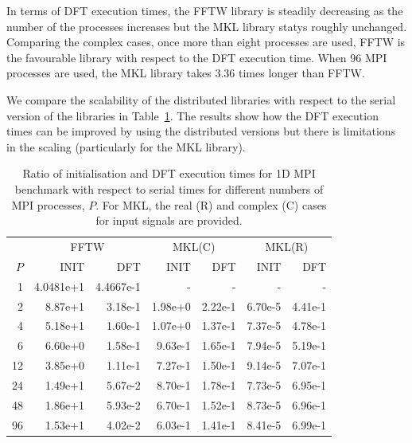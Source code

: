\documentclass[12pt, a4paper]{article} \setlength{\textheight}{24cm}
\begin{document}
In terms of DFT execution times, the FFTW library is steadily
decreasing as the number of the processes increases but the MKL
library statys roughly unchanged. Comparing the complex cases, once
more than eight processes are used, FFTW is the favourable library
with respect to the DFT execution time. When 96 MPI processes are
used, the MKL library takes 3.36 times longer than FFTW.

We compare the scalability of the distributed libraries with respect
to the serial version of the libraries in Table~\ref{Tbl:MPI}. The
results show how the DFT execution times can be improved by using the
distributed versions but there is limitations in the scaling
(particularly for the MKL library).

\begin{small}
\begin{table}[H]
  \centering
  \begin{tabular}{|r|rr|rr|rr|}
    \hline
    & \multicolumn{2}{|c|}{FFTW} & \multicolumn{2}{|c|}{MKL(C)} &   \multicolumn{2}{|c|}{MKL(R)}   \\
   $P$ & INIT & DFT & INIT & DFT & INIT & DFT  \\
    \hline
     1 &   4.0481e+1 &   4.4667e-1 &          - &         - &         - &         - \\
   2 &   8.87e+1 &   3.18e-1 &   1.98e+0 &   2.22e-1 &   6.70e-5 &   4.41e-1 \\
   4 &   5.18e+1 &   1.60e-1 &   1.07e+0 &   1.37e-1 &   7.37e-5 &   4.78e-1 \\
   6 &   6.60e+0 &   1.58e-1 &   9.63e-1 &   1.65e-1 &   7.94e-5 &   5.19e-1 \\
   12 &  3.85e+0 &   1.11e-1 &   7.27e-1 &   1.50e-1 &   9.14e-5 &   7.07e-1 \\
   24 &  1.49e+1 &   5.67e-2 &   8.70e-1 &   1.78e-1 &   7.73e-5 &   6.95e-1 \\
   48 &  1.86e+1 &   5.93e-2 &   6.70e-1 &   1.52e-1 &   8.73e-5 &   6.96e-1 \\
   96 &  1.53e+1 &   4.02e-2 &   6.03e-1 &   1.41e-1 &   8.41e-5 &   6.99e-1 \\
    \hline
  \end{tabular}
  \caption{Ratio of initialisation and DFT execution times for 1D MPI benchmark with respect to serial times for different numbers of MPI processes, $P.$ For MKL, the real (R) and complex (C) cases for input signals are provided.}\label{Tbl:MPI}
\end{table}
\end{small}
\end{document}
